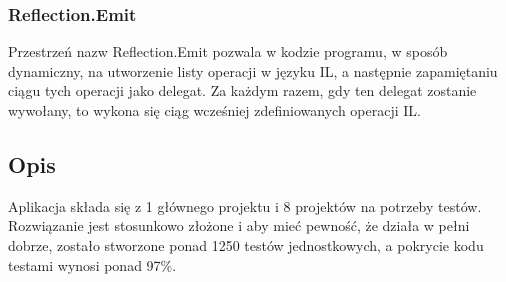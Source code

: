 \documentclass[12pt]{article}
\begin{document}
\subsubsection{Reflection.Emit}
Przestrzeń nazw Reflection.Emit pozwala w kodzie programu, w sposób dynamiczny, na utworzenie listy operacji w języku IL, a następnie zapamiętaniu ciągu tych operacji jako delegat. Za każdym razem, gdy ten delegat zostanie wywołany, to wykona się ciąg wcześniej zdefiniowanych operacji IL.


\subsection{Opis}
Aplikacja składa się z 1 głównego projektu i 8 projektów na potrzeby testów. Rozwiązanie jest stosunkowo złożone i aby mieć pewność, że działa w pełni dobrze, zostało stworzone  ponad 1250 testów jednostkowych, a pokrycie kodu testami wynosi ponad 97\%.\\
\end{document}
